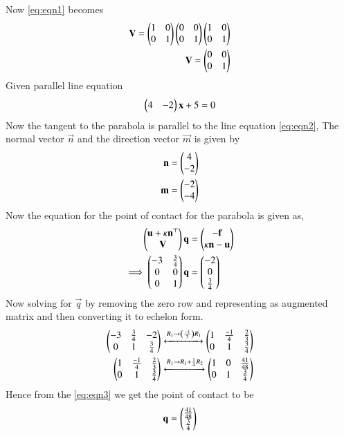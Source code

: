 \documentclass[journal,12pt,twocolumn]{IEEEtran}
\begin{document}
Now \eqref{eq:eqn1} becomes
\begin{align}
    \mathbf{V}=\begin{pmatrix}1&0 \\ 0&1\end{pmatrix}\begin{pmatrix}0&0 \\ 0&1\end{pmatrix}\begin{pmatrix}1&0 \\ 0&1\end{pmatrix}
    \\
    \mathbf{V}=\begin{pmatrix}0&0 \\ 0&1\end{pmatrix}
\end{align}
Given parallel line equation 
\begin{align}
 \begin{pmatrix}4&-2\end{pmatrix}\mathbf{x} + 5 = 0\label{eq:eqn2}
\end{align}
Now the tangent to the parabola is parallel to the line equation \eqref{eq:eqn2},
The normal vector $\vec{n}$ and the direction vector $\vec{m}$ is given by 
\begin{align}
    \mathbf{n}=\begin{pmatrix}4 \\ -2\end{pmatrix} \label{eq:eqn5}
    \\
    \mathbf{m}=\begin{pmatrix}-2 \\ -4\end{pmatrix}
\end{align}
Now the equation for the point of contact for the parabola is given as,
\begin{align}
    \begin{pmatrix}\mathbf{u}+\kappa \mathbf{n}^{\top} \\ \mathbf{V} \end{pmatrix}\mathbf{q} &= \begin{pmatrix}\mathbf{-f}\\\kappa \mathbf{n} -\mathbf{u}\end{pmatrix}
    \\
   \implies\begin{pmatrix}-3&\frac{3}{4} \\ 0&0 \\ 0&1\end{pmatrix} \mathbf{q}&= \begin{pmatrix}-2 \\ 0 \\ \frac{3}{4}\end{pmatrix}
\end{align}
Now solving for $\vec{q}$ by removing the zero row and representing as augmented matrix and then converting it to echelon form.
\begin{align}
    \begin{pmatrix}-3&\frac{3}{4}&-2 \\ 0&1&\frac{3}{4}\end{pmatrix}\xleftrightarrow{R_1\rightarrow \ensuremath{\left(\frac{-1}{3}\right)}R_1} \begin{pmatrix}1&\frac{-1}{4}&\frac{2}{3} \\ 0&1&\frac{3}{4}\end{pmatrix}
    \\
    \begin{pmatrix}1&\frac{-1}{4}&\frac{2}{3} \\ 0&1&\frac{3}{4}\end{pmatrix}\xleftrightarrow{R_1\rightarrow R_1+\frac{1}{4}R_2}\begin{pmatrix}1&0&\frac{41}{48} \\ 0&1&\frac{3}{4}\end{pmatrix} \label{eq:eqn3}
\end{align}
Hence from the \eqref{eq:eqn3} we get the point of contact to be 
\begin{align}
    \mathbf{q}=\begin{pmatrix}\frac{41}{48} \\ \frac{3}{4}\end{pmatrix}
\end{align}
\end{document}
